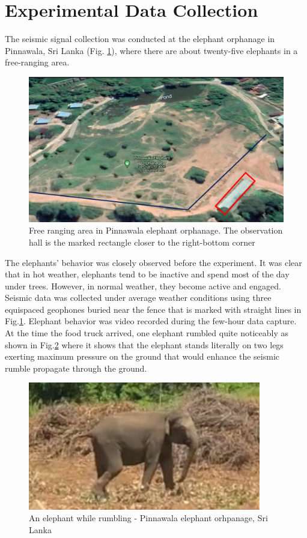 \documentclass[applsci,article,accept,moreauthors,pdftex]{Definitions/mdpi}
\begin{document}
\section{Experimental Data Collection}
The seismic signal collection was conducted at the elephant orphanage in Pinnawala, Sri Lanka (Fig. \ref{fig:figure3nn}), where there are about twenty-five elephants in a free-ranging area.
\begin{figure}[h]
	\centering   \includegraphics[width=4.5in]{figures/PinnawalaMap}
	\caption{Free ranging area in Pinnawala elephant orphanage. The observation hall is the marked rectangle closer to the right-bottom corner}
	\label{fig:figure3nn}
\end{figure}
The elephants’ behavior was closely observed before the experiment. It was clear that in hot weather, elephants tend to be inactive and spend most of the day under trees. However, in normal weather, they become active and engaged. Seismic data was collected under average weather conditions using three equispaced geophones buried near the fence that is marked with straight lines in Fig.\ref{fig:figure3nn}. Elephant behavior was video recorded during the few-hour data capture. At the time the food truck arrived, one elephant rumbled quite noticeably as shown in Fig.\ref{fig_rumble} where it shows that the elephant stands literally on two legs exerting maximum pressure on the ground that would enhance the seismic rumble propagate through the ground.
\begin{figure}
	\centering   \includegraphics[width=4in]{figures/rumble.png}
	\caption{An elephant while rumbling - Pinnawala elephant orhpanage, Sri Lanka}
	\label{fig_rumble}
\end{figure}
\end{document}
